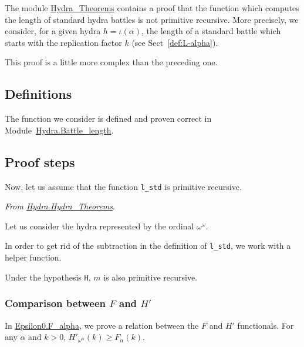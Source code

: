The module \href{../theories/html/hydras.Hydra.Hydra_Theorems.html}{Hydra\_Theorems} contains a proof that the function which computes the length of standard hydra battles is not primitive recursive. More precisely, we consider, for a given hydra $h=\iota(\alpha)$, the length of a standard battle which starts with the replication factor $k$ (see Sect~\vref{def:L-alpha}).

This proof is  a little more complex than the preceding one.

\subsection{Definitions}

The function we consider is defined and proven correct in
Module~\href{../theories/html/hydras.Hydra.Battle_length.html}{Hydra.Battle\_length}.



\subsection{Proof steps}

Now, let us assume that the function \texttt{l\_std} is primitive recursive.


\emph{From \href{../theories/html/hydras.Hydra.Hydra_Theorems.html}{Hydra.Hydra\_Theorems}}.



Let us consider the hydra represented by the ordinal $\omega^\omega$.




In order to get rid of the subtraction in the definition of \texttt{l\_std}, we work with a helper function.



Under the hypothesis \texttt{H}, $m$ is also primitive recursive.




\subsubsection{Comparison between $F$ and $H'$}

In \href{../theories/html/hydras.Epsilon0.F_alpha.html}{Epsilon0.F\_alpha}, we prove a relation between the $F$ and $H'$ functionals. For any $\alpha$ and $k>0$,
$H'_{\omega^\alpha}(k)\geq F_\alpha(k)$.

